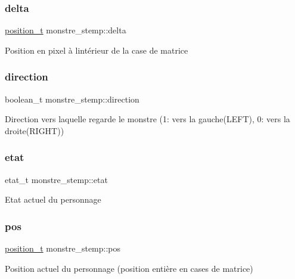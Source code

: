 \subsubsection{\texorpdfstring{delta}{delta}}
{\footnotesize\ttfamily \hyperlink{structposition__s}{position\+\_\+t} monstre\+\_\+stemp\+::delta}

Position en pixel à l\textquotesingle{}intérieur de la case de matrice \mbox{\label{structmonstre__stemp_a66e083b29f2101e51efd2261ed45fcb4}} 
\subsubsection{\texorpdfstring{direction}{direction}}
{\footnotesize\ttfamily boolean\+\_\+t monstre\+\_\+stemp\+::direction}

Direction vers laquelle regarde le monstre (1\+: vers la gauche(\+L\+E\+F\+T), 0\+: vers la droite(\+R\+I\+G\+H\+T)) \mbox{\label{structmonstre__stemp_afccb029fd83b1f1bee514f4b9d57c75c}} 
\subsubsection{\texorpdfstring{etat}{etat}}
{\footnotesize\ttfamily etat\+\_\+t monstre\+\_\+stemp\+::etat}

Etat actuel du personnage \mbox{\label{structmonstre__stemp_ac54692aa2c0b43403033f82b75c1f63a}} 
\subsubsection{\texorpdfstring{pos}{pos}}
{\footnotesize\ttfamily \hyperlink{structposition__s}{position\+\_\+t} monstre\+\_\+stemp\+::pos}

Position actuel du personnage (position entière en cases de matrice) \mbox{\label{structmonstre__stemp_a2a38c6df6274f86d3ef974ef0c37b5c1}} 
